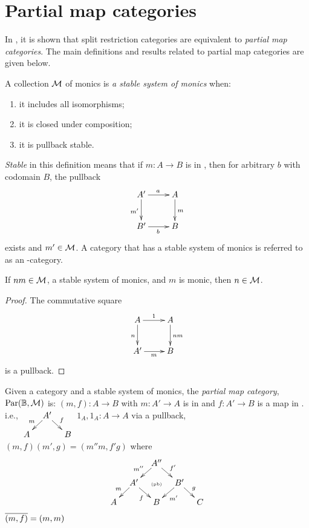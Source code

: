 \section{Partial map categories} %
\label{sub:partial_map_categories}

In \cite{cockett2002:restcategories1}, it is shown that split restriction categories are
equivalent to \emph{partial map categories}. The main definitions and results related to
partial map categories are given below.

\begin{definition}
  A collection $\mathcal{M}$ of monics is \emph{a stable system of monics}
  when:
  \begin{enumerate}[{(}i{)}]
    \item it includes all isomorphisms;
    \item it is closed under composition;
    \item it is pullback stable.
  \end{enumerate}
\end{definition}

\emph{Stable} in this definition means that if $m:A\to B$ is in \Mstab, then for arbitrary
$b$ with codomain $B$, the pullback
\[
  \xymatrix{
    A'\ar[r]^a \ar[d]_{m'} &A\ar[d]^{m}\\
    B' \ar[r]_{b} & B
  }
\]
exists and $m' \in \mathcal{M}$. A category that has a stable system of monics
is referred to as an \Mstab-category.

\begin{lemma}
  If $n m \in \mathcal{M}$, a stable system of monics, and $m$ is monic, then $n \in \mathcal{M}$.
\end{lemma}
\begin{proof}
  The commutative square
  \[
    \xymatrix{
      A\ar[d]_n \ar[r]^{1} &A\ar[d]^{n m}\\
      A' \ar[r]_{m} & B
    }
  \]
  is a pullback.
\end{proof}

Given a category \B and a stable system of monics, the \emph{partial map category},
$\text{Par}(\mathbb{B},\mathcal{M})$ is:
    {$(m,f):A\to B$  with $m:A' \to A$ is in \Mstab and $f:A' \to B$ is a map in \B. i.e.,
      $\xymatrix @R-15pt @C-15pt{&A'\ar[dl]_{m} \ar[dr]^{f}\\A&&B}$}
    {$1_A,1_A:A \to A$}
    {via a pullback, $(m,f)(m',g) = (m'' m, f' g)$ where
      \[
        \xymatrix @C-15pt @R-15pt{
          &&A''\ar[dl]_{m''}\ar[dr]^{f'}\\
          &A'\ar[dl]_{m}\ar[dr]_{f}&\text{{\tiny (pb)}}&B'\ar[dl]^{m'}\ar[dr]^{g}\\
          A&&B&&C
        }
      \]
    }
    {$\overline{(m,f)} = (m,m)$}

